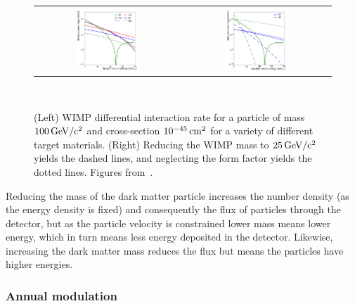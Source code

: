 \begin{figure}[htb]
\centering
    \begin{tabular}{cc}
    \includegraphics[width=0.45\textwidth]{figures/dm/rate_comp_v03} & \includegraphics[width=0.45\textwidth]{figures/dm/rate_var_vs01} \\
    \end{tabular}
    \caption{(Left) WIMP differential interaction rate for a particle of mass $100\,\mathrm{GeV/c^2}$ and cross-section $10^{-45}\,\mathrm{cm^2}$ for a variety of different target materials. (Right) Reducing the WIMP mass to $25\,\mathrm{GeV/c^2}$ yields the dashed lines, and neglecting the form factor yields the dotted lines. Figures from~\cite{Undagoitia:2015gya}.}~\label{fig:dm_rate}
\end{figure}

Reducing the mass of the dark matter particle increases the number density (as the energy density is fixed) and consequently the flux of particles through the detector, but as the particle velocity is constrained lower mass means lower energy, which in turn means less energy deposited in the detector. Likewise, increasing the dark matter mass reduces the flux but means the particles have higher energies.

\subsubsection{Annual modulation}

